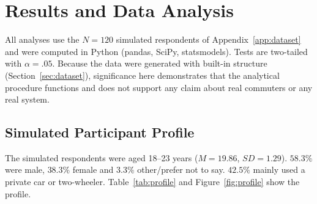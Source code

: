 \documentclass[11pt,a4paper]{article}
\begin{document}
\section{Results and Data Analysis}
\label{sec:results}

\begin{center}
\end{center}

All analyses use the $N = 120$ simulated respondents of Appendix~\ref{app:dataset} and were computed
in Python (pandas, SciPy, statsmodels). Tests are two-tailed with $\alpha = .05$. Because the data
were generated with built-in structure (Section~\ref{sec:dataset}), significance here demonstrates
that the analytical procedure functions and does not support any claim about real commuters or any
real system.

\subsection{Simulated Participant Profile}
The simulated respondents were aged 18--23 years ($M = 19.86$, $SD = 1.29$). $58.3\%$ were male,
$38.3\%$ female and $3.3\%$ other/prefer not to say. $42.5\%$ mainly used a private car or
two-wheeler. Table~\ref{tab:profile} and Figure~\ref{fig:profile} show the profile.
\end{document}
